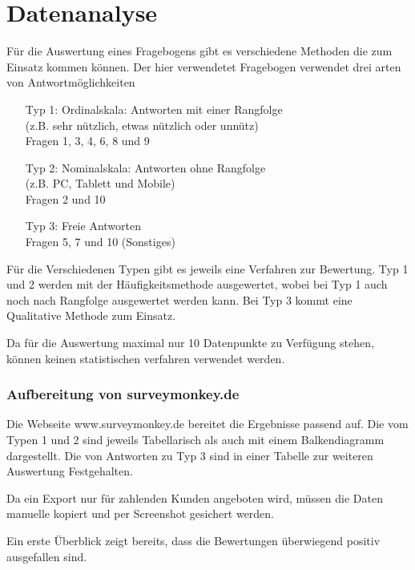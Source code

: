 \chapter{Datenanalyse}
Für die Auswertung eines Fragebogens gibt es verschiedene Methoden die zum Einsatz kommen können. Der hier verwendetet Fragebogen verwendet drei arten von Antwortmöglichkeiten
\begin{itemize}
	\item[Typ 1:] {Ordinalskala: Antworten mit einer Rangfolge\\
		(z.B. sehr nützlich, etwas nützlich oder unnütz)\\
		Fragen 1, 3, 4, 6, 8 und 9}
	\item[Typ 2:] {Nominalskala: Antworten ohne Rangfolge\\
		(z.B. PC, Tablett und Mobile)\\
		Fragen 2 und 10}
	\item[Typ 3:] {Freie Antworten \\
		Fragen 5, 7 und 10 (Sonstiges)}
\end{itemize}
Für die Verschiedenen Typen gibt es jeweils eine Verfahren zur Bewertung.
Typ 1 und 2 werden mit der Häufigkeitsmethode ausgewertet, wobei bei Typ 1 auch noch nach Rangfolge ausgewertet werden kann. Bei Typ 3 kommt eine Qualitative Methode zum Einsatz.

Da für die Auswertung maximal nur 10 Datenpunkte zu Verfügung stehen, können keinen statistischen verfahren verwendet werden.

\subsection{Aufbereitung von surveymonkey.de}
Die Webseite www.surveymonkey.de bereitet die Ergebnisse passend auf. Die vom Typen 1 und 2 sind jeweils Tabellarisch als auch mit einem Balkendiagramm dargestellt.
Die von Antworten zu Typ 3 sind in einer Tabelle zur weiteren Auswertung Festgehalten.

Da ein Export nur für zahlenden Kunden angeboten wird, müssen die Daten manuelle kopiert und per Screenshot gesichert werden.

Ein erste Überblick zeigt bereits, dass die Bewertungen überwiegend positiv ausgefallen sind.

